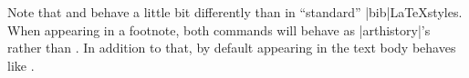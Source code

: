 \documentclass[a4paper,
10pt,
ngerman,
english
]{ltxdoc}
\begin{document}
Note that  and  behave a little bit differently than in \enquote{standard} |bib|\LaTeX styles. When appearing in a footnote, both commands will behave as |arthistory|'s  rather than . In addition to that, by default  appearing in the text body behaves like .

%
%
%
%
%
%
%
%
%
\end{document}
